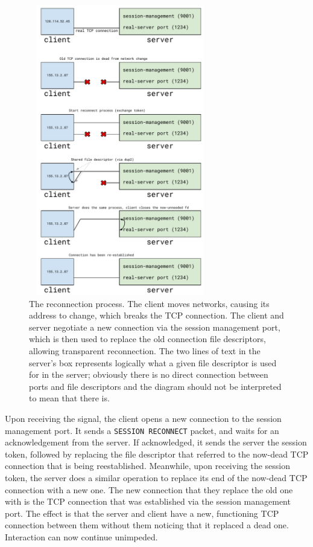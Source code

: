 \documentclass[twocolumn,11pt]{article}
\begin{document}
\begin{figure}[!htb]
	\centering
		\setlength{\belowcaptionskip}{-10pt}
		\hspace*{-5mm}
	\includegraphics[width=80mm,height=127mm]{fig/reconn_diag}
	\caption{The reconnection process. The client moves networks, causing its
	address to change, which breaks the TCP connection. The client and server
	negotiate a new connection via the session management port, which is then
	used to replace the old connection file descriptors, allowing transparent
	reconnection. The two lines of text in the server's box represents logically
	what a given file descriptor is used for in the server; obviously there is
	no direct connection between ports and file descriptors and the diagram
	should not be interpreted to mean that there is.}
	\label{fig:recproc}
\end{figure}

Upon receiving the signal, the client opens a new connection to the session
management port. It sends a \texttt{SESSION RECONNECT} packet, and waits for an
acknowledgement from the server. If acknowledged, it sends the server the
session token, followed by replacing the file descriptor that referred to the
now-dead TCP connection that is being reestablished. Meanwhile, upon receiving
the session token, the server does a similar operation to replace its end of the
now-dead TCP connection with a new one. The new connection that they replace the
old one with is the TCP connection that was established via the session
management port. The effect is that the server and client have a new,
functioning TCP connection between them without them noticing that it replaced a
dead one. Interaction can now continue unimpeded.
\end{document}
